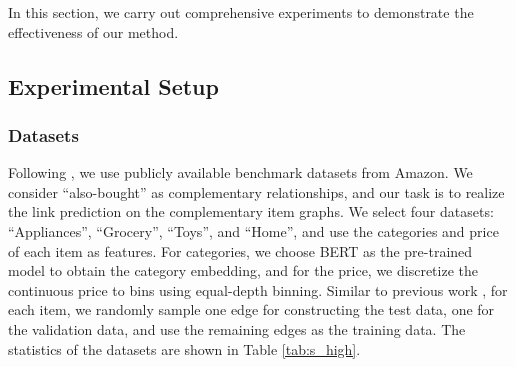 \documentclass[letterpaper]{article} %
\begin{document}
 In this section, we carry out comprehensive experiments to demonstrate the effectiveness of our method.
 \subsection{Experimental Setup}
 \subsubsection{Datasets}


Following \cite{liu2020decoupled, hao2020p, bibas2023semi}, we use publicly available benchmark datasets from Amazon. We consider ``also-bought'' as complementary relationships, and our task is to realize the link prediction on the complementary item graphs. We select four datasets: ``Appliances'', ``Grocery'', ``Toys'', and ``Home'', and use the categories and price of each item as features. For categories, we choose BERT \cite{vaswani2017attention} as the pre-trained model to obtain the category embedding, and for the price, we discretize the continuous price to bins using equal-depth binning. Similar to previous work \cite{liu2020decoupled}, for each item, we randomly sample one edge for constructing the test data, one for the validation data, and use the remaining edges as the training data. The statistics of the datasets are shown in Table \ref{tab:s_high}.
\end{document}
